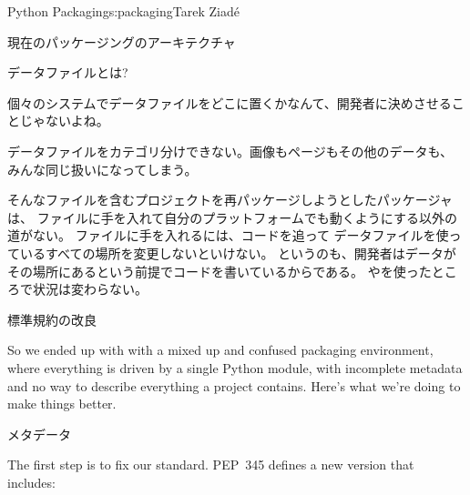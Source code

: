 \begin{aosachapter}{Python Packaging}{s:packaging}{Tarek Ziad\'{e}}
\begin{aosasect1}{現在のパッケージングのアーキテクチャ}
\begin{aosasect2}{データファイルとは?}
\begin{aosaitemize}
  \item 個々のシステムでデータファイルをどこに置くかなんて、開発者に決めさせることじゃないよね。

  \item データファイルをカテゴリ分けできない。画像もページもその他のデータも、
  みんな同じ扱いになってしまう。

\end{aosaitemize}

そんなファイルを含むプロジェクトを再パッケージしようとしたパッケージャは、
ファイルに手を入れて自分のプラットフォームでも動くようにする以外の道がない。
ファイルに手を入れるには、コードを追って
データファイルを使っているすべての場所を変更しないといけない。
というのも、開発者はデータがその場所にあるという前提でコードを書いているからである。
やを使ったところで状況は変わらない。

\end{aosasect2}

\end{aosasect1}

\begin{aosasect1}{標準規約の改良}

So we ended up with with a mixed up and confused packaging
environment, where everything is driven by a single Python module,
with incomplete metadata and no way to describe everything a project
contains.  Here's what we're doing to make things better.

\begin{aosasect2}{メタデータ}

The first step is to fix our  standard.  PEP~345
defines a new version that includes:


\end{aosasect2}
\end{aosasect1}
\end{aosachapter}

